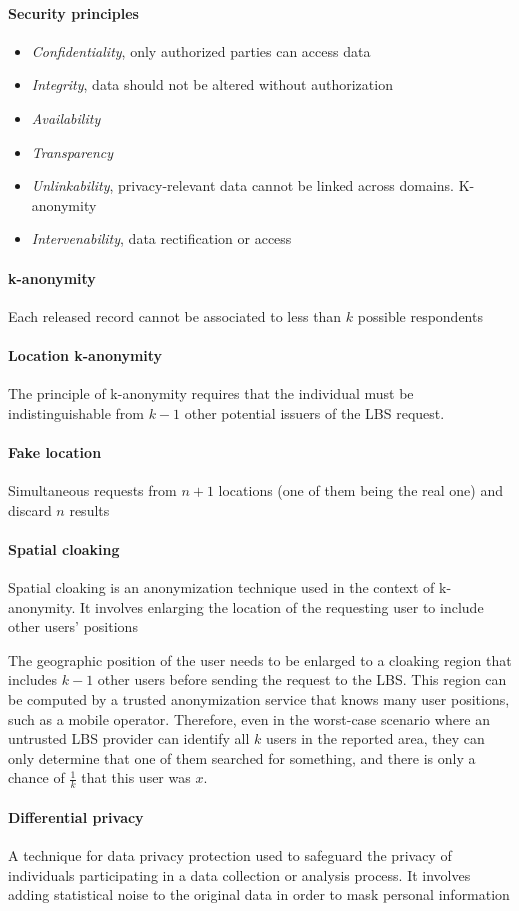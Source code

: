 \paragraph{Security principles}
\begin{itemize}
    \item \textit{Confidentiality}, only authorized parties can access data
    \item \textit{Integrity}, data should not be altered without authorization
    \item \textit{Availability}
    \item \textit{Transparency}
    \item \textit{Unlinkability}, privacy-relevant data cannot be linked across domains. K-anonymity
    \item \textit{Intervenability}, data rectification or access
\end{itemize}

\paragraph{k-anonymity}
Each released record cannot be associated to less than $k$ possible respondents

\paragraph{Location k-anonymity}
The principle of k-anonymity requires that the individual must be indistinguishable from $k - 1$ other potential issuers of the LBS request. 

\paragraph{Fake location}
Simultaneous requests from $n+1$ locations (one of them being
the real one) and discard $n$ results

\paragraph{Spatial cloaking}
Spatial cloaking is an anonymization technique used in the context of k-anonymity. It involves enlarging the location of the requesting user to include other users' positions

The geographic position of the user needs to be enlarged to a cloaking region that includes $k-1$ other users before sending the request to the LBS. This region can be computed by a trusted anonymization service that knows many user positions, such as a mobile operator. Therefore, even in the worst-case scenario where an untrusted LBS provider can identify all $k$ users in the reported area, they can only determine that one of them searched for something, and there is only a chance of $\frac{1}{k}$ that this user was $x$.

\paragraph{Differential privacy}
A technique for data privacy protection used to safeguard the privacy of individuals participating in a data collection or analysis process. It involves adding statistical noise to the original data in order to mask personal information

\newpage